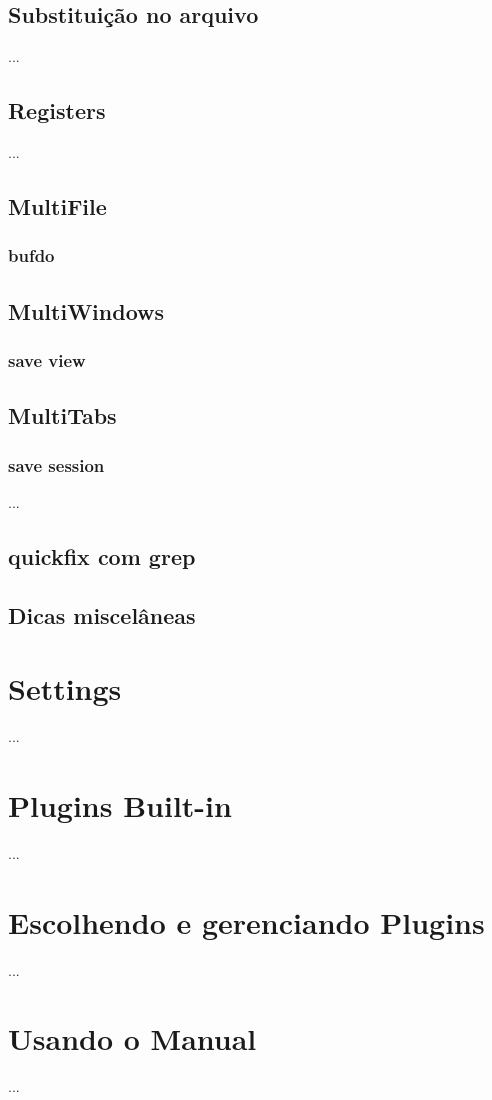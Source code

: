 \documentclass[a4paper, 12pt]{article}
\begin{document}
\subsection{Substituição no arquivo}
...
\subsection{Registers}
...
\subsection{MultiFile}
\subsubsection{bufdo}

\subsection{MultiWindows}
\subsubsection{save view}

\subsection{MultiTabs}
\subsubsection{save session}
...

\subsection{quickfix com grep}
\subsection{Dicas miscelâneas}

\newpage
\section{Settings}
...

\newpage
\section{Plugins Built-in}
...

\newpage
\section{Escolhendo e gerenciando Plugins}
...

\newpage
\section{Usando o Manual}
...
\newpage
\end{document}
